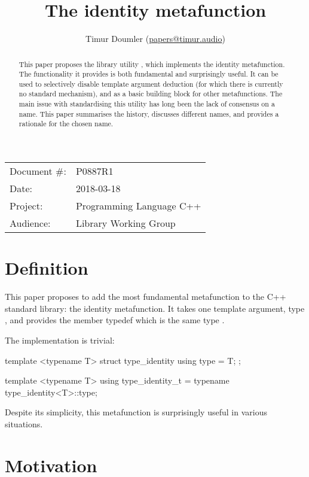 


\title{The identity metafunction}
\author{ Timur Doumler \small(\href{mailto:papers@timur.audio}{papers@timur.audio}) }
\date{}
\maketitle

\begin{tabular}{ll}
Document \#: & P0887R1 \\
Date: &2018-03-18 \\
Project: & Programming Language C++ \\
Audience: & Library Working Group
\end{tabular}

\begin{abstract}
This paper proposes the library utility , which implements the identity metafunction. The functionality it provides is both fundamental and surprisingly useful. It can be used to selectively disable template argument deduction (for which there is currently no standard mechanism), and as a basic building block for other metafunctions. The main issue with standardising this utility has long been the lack of consensus on a name. This paper summarises the history, discusses different names, and provides a rationale for the chosen name.
\end{abstract}

\section{Definition}
\label{sec:def}
This paper proposes to add the most fundamental metafunction to the C++ standard library: the identity metafunction. It takes one template argument, type , and provides the member typedef  which is the same type .

The implementation is trivial: 

\begin{codeblock}
template <typename T>
struct type_identity { using type = T; };

template <typename T>
using type_identity_t = typename type_identity<T>::type;
\end{codeblock}

Despite its simplicity, this metafunction is surprisingly useful in various situations.

\section{Motivation}
